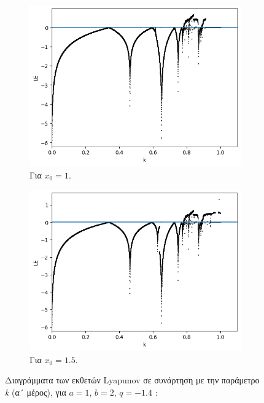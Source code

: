 \begin{figure}[h!]
\begin{subfigure}[b]{0.45\textwidth}
		\includegraphics[width=\textwidth]{LateX images/graphs q16/g9}
		\caption{Για \(x_0=1\).}
		\label{f:g35}
	\end{subfigure}
	\hfill
	\begin{subfigure}[b]{0.45\textwidth}
		\centering
		\includegraphics[width=\textwidth]{LateX images/graphs q16/g10}
		\caption{Για \(x_0=1.5\).}
		\label{f:g36}
	
	\end{subfigure}
	\hfill
	\caption{ Διαγράμματα των εκθετών Lyapunov σε συνάρτηση με την παράμετρο \emph{k} (α´ μέρος), για $a = 1$, $b = 2$, $q=-1.4$ :}
	\label{f:g235}
\end{figure}

